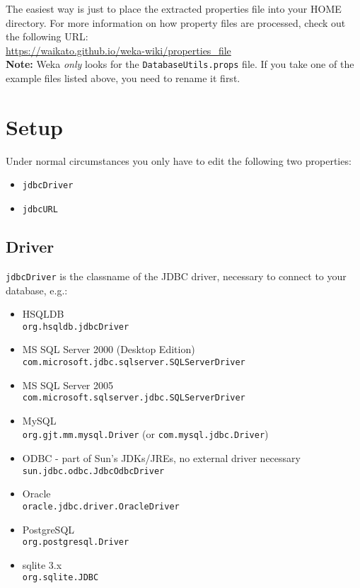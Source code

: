 The easiest way is just to place the extracted properties file into your HOME directory. For more information on how property files are processed, check out the following URL: \\

\url{https://waikato.github.io/weka-wiki/properties_file}{} \\

\noindent \textbf{Note:} Weka \textit{only} looks for the \texttt{DatabaseUtils.props} file. If you take one of the example files listed above, you need to rename it first.


\section{Setup}
Under normal circumstances you only have to edit the following two properties:

\begin{itemize}
	\item \texttt{jdbcDriver}
	\item \texttt{jdbcURL}
\end{itemize}

\subsection*{Driver}
\texttt{jdbcDriver} is the classname of the JDBC driver, necessary to connect to your database, e.g.:

\begin{itemize}
	\item HSQLDB \\
	\texttt{org.hsqldb.jdbcDriver}
	\item MS SQL Server 2000 (Desktop Edition) \\
	\texttt{com.microsoft.jdbc.sqlserver.SQLServerDriver}
	\item MS SQL Server 2005 \\
	\texttt{com.microsoft.sqlserver.jdbc.SQLServerDriver}
	\item MySQL \\
	\texttt{org.gjt.mm.mysql.Driver} (or \texttt{com.mysql.jdbc.Driver})
	\item ODBC - part of Sun's JDKs/JREs, no external driver necessary \\
	\texttt{sun.jdbc.odbc.JdbcOdbcDriver}
	\item Oracle \\
	\texttt{oracle.jdbc.driver.OracleDriver}
	\item PostgreSQL \\
	\texttt{org.postgresql.Driver}
	\item sqlite 3.x \\
	\texttt{org.sqlite.JDBC}
\end{itemize}

